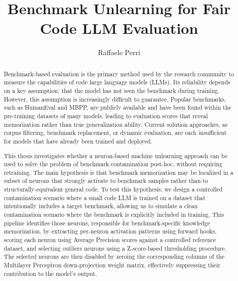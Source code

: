 \documentclass[mscthesis]{usiinfthesis}
\title{Benchmark Unlearning for Fair Code LLM Evaluation}
\author{Raffaele Perri}
\begin{document}
\maketitle %

\frontmatter %

\begin{abstract}
Benchmark-based evaluation is the primary method used by the research community to measure
the capabilities of code large language models (LLMs). 
Its reliability depends on a key assumption: that the model has not seen the benchmark during training. However, this assumption is increasingly difficult to guarantee.
Popular benchmarks, such as HumanEval and MBPP, are publicly available and have been found within
the pre-training datasets of many models, leading to evaluation scores that reveal memorization rather than true generalization ability.
Current solution approaches, as corpus filtering, benchmark replacement, or dynamic evaluation, are each insufficient for models that
have already been trained and deployed.

This thesis investigates whether a neuron-based machine unlearning approach can be used to
solve the problem of benchmark contamination post-hoc, without requiring retraining.
The main hypothesis is that benchmark memorization may be localized in a subset of neurons
that strongly activate to benchmark samples rather than to structurally-equivalent general code.
To test this hypothesis, we design a controlled contamination scenario where a small code LLM is trained on a dataset that intentionally includes a target benchmark, allowing us to simulate a clean contamination scenario where the benchmark is explicitly included in training.
This pipeline identifies those neurons, responsible for benchmark-specific knowledge memorization,
by extracting per-neuron activation patterns using forward hooks, scoring each neuron using
Average Precision scores against a controlled reference dataset, and selecting outliers neurons
using a Z-score-based thresholding procedure.
The selected neurons are then disabled by zeroing the corresponding columns of the Multilayer Perceptron down-projection weight matrix,
effectively suppressing their contribution to the model's output.


\end{abstract}
\end{document}
